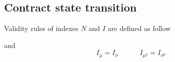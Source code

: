\documentclass{llncs}
\begin{document}
\subsection{Contract state transition} Validity rules of indexes $N$ and $I$ are defined as follow

and
$$I_\mu = I_\sigma \quad\quad\quad  I_{\mu^p} = I_{\sigma^p}$$



%
%
\printbibliography
\end{document}
